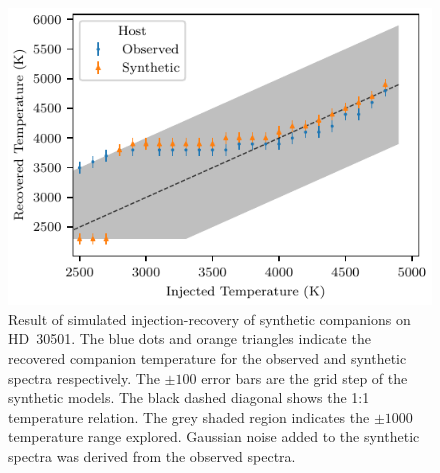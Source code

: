 \begin{figure}
    \centering
    \includegraphics[width=0.8\linewidth]{figures/companion_recovery/inject_recovery_hd30501.pdf}
    \caption[Result of simulated injection-recovery of synthetic companions on {HD~30501}.]{Result of simulated injection-recovery of synthetic companions on {HD~30501}.
        The blue dots and orange triangles indicate the recovered companion temperature for the observed and synthetic spectra respectively.
        The \(\pm100\)\K{} error bars are the grid step of the synthetic models.
        The black dashed diagonal shows the 1:1 temperature relation.
        The grey shaded region indicates the \(\pm1000\)\K{} temperature range explored.
        Gaussian noise added to the synthetic spectra was derived from the observed spectra.}
    \label{fig:injectrecoveryhd30501}
\end{figure}
